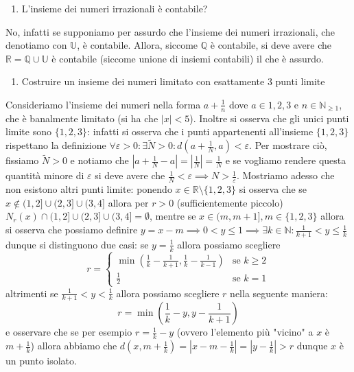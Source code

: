 \documentclass{report}
\begin{document}
\begin{enumerate}[resume, label=\protect\circled{\arabic*}]
	\item L'insieme dei numeri irrazionali è contabile?
\end{enumerate}
\begin{mysolution} No, infatti se supponiamo per assurdo che l'insieme dei numeri irrazionali, che denotiamo con $\mathbb{U}$, è contabile. Allora, siccome $\mathbb{Q}$ è contabile, si deve avere che $\mathbb{R} = \mathbb{Q} \cup \mathbb{U}$ è contabile (siccome unione di insiemi contabili) il che è assurdo.
\end{mysolution}
\begin{enumerate}[resume, label=\protect\circled{\arabic*}]
	\item Costruire un insieme dei numeri limitato con esattamente 3 punti limite
\end{enumerate}
\begin{mysolution}
	Consideriamo l'insieme dei numeri nella forma $a+\frac{1}{n}$ dove $a \in {1,2,3}$ e $n \in \mathbb{N}_{\geq 1}$, che è banalmente limitato (si ha che $|x| < 5$). Inoltre si osserva che gli unici punti limite sono $\{ 1, 2, 3 \}$: infatti si osserva che i punti appartenenti all'insieme $\{ 1, 2, 3 \} $ rispettano la definizione $\forall \varepsilon > 0: \exists \tilde{N} > 0: d(a + \frac{1}{N}, a) < \varepsilon$. Per mostrare ciò, fissiamo $\tilde{N} > 0$ e notiamo che $|a + \frac{1}{N} - a| = |\frac{1}{N}| = \frac{1}{N}$ e se vogliamo rendere questa quantità minore di $\varepsilon$ si deve avere che $\frac{1}{N} < \varepsilon \implies N > \frac{1}{\varepsilon}$. Mostriamo adesso che non esistono altri punti limite: ponendo $x \in \mathbb{R} \setminus \{ 1, 2, 3 \}$ si osserva che se $x \not\in (1, 2] \cup (2, 3] \cup (3, 4]$ allora per $r>0$ (sufficientemente piccolo) $N_r(x) \cap (1, 2] \cup (2, 3] \cup (3, 4] = \emptyset$, mentre se $x \in (m, m+1], m \in \{1, 2, 3\}$ allora si osserva che possiamo definire $y=x-m \implies 0<y \leq 1 \implies \exists k \in \mathbb{N}: \frac{1}{k+1} < y \leq \frac{1}{k}$ dunque si distinguono due casi: se $y=\frac{1}{k}$ allora possiamo scegliere
	\begin{equation*}
		r = \begin{cases} \min{ \left( \frac{1}{k} - \frac{1}{k+1}, \frac{1}{k} - \frac{1}{k-1} \right)}	 & \text{se } k \geq 2 \\ 
		\frac{1}{2} & \text{se } k=1		
		\end{cases}
	\end{equation*}
altrimenti se $\frac{1}{k+1} < y < \frac{1}{k}$ allora possiamo scegliere $r$ nella seguente maniera:
	\begin{equation*}
		r = \min{\left( \frac{1}{k} - y, y-\frac{1}{k+1} \right)}
	\end{equation*}
	e osservare che se per esempio $r = \frac{1}{k} - y$ (ovvero l'elemento più "vicino" a $x$ è $m + \frac{1}{k}$) allora abbiamo che $d(x, m + \frac{1}{k}) = |x - m - \frac{1}{k}| = |y - \frac{1}{k}| > r$ dunque $x$ è un punto isolato.
\end{mysolution}
\end{document}
